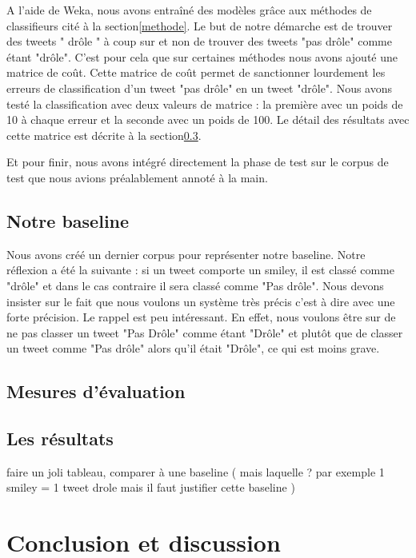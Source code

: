 \documentclass[10pt,a4paper,twoside]{article}
\begin{document}
A l'aide de Weka, nous avons entraîné des modèles grâce aux méthodes de classifieurs cité à la section\ref{methode}. Le but de notre démarche est de trouver des tweets " drôle " à coup sur et non de trouver des tweets "pas drôle" comme étant "drôle". C'est pour cela que sur certaines méthodes nous avons ajouté une matrice de coût. Cette matrice de coût permet de sanctionner lourdement les erreurs de classification d'un tweet "pas drôle" en un tweet "drôle". Nous avons testé la classification avec deux valeurs de matrice : la première avec un poids de 10 à chaque erreur et la seconde avec un poids de 100. Le détail des résultats avec cette matrice est décrite à la section\ref{res}.

Et pour finir, nous avons intégré directement la phase de test sur le corpus de test que nous avions préalablement annoté à la main.

\subsection{Notre baseline}
Nous avons créé un dernier corpus pour représenter notre baseline. Notre réflexion a été la suivante : si un tweet comporte un smiley, il est classé comme "drôle" et dans le cas contraire il sera classé comme "Pas drôle". Nous devons insister sur le fait que nous voulons un système très précis c'est à dire avec une forte précision. Le rappel est peu intéressant. En effet, nous voulons être sur de ne pas classer un tweet "Pas Drôle" comme étant "Drôle" et plutôt que de classer un tweet comme "Pas drôle" alors qu'il était "Drôle", ce qui est moins grave.


\subsection{Mesures d'évaluation}

\subsection{Les résultats}
\label{res}
faire un joli tableau, comparer à une baseline ( mais laquelle ? par exemple  1 smiley = 1 tweet drole mais il faut justifier cette baseline ) 



\section{Conclusion et discussion}
\end{document}
